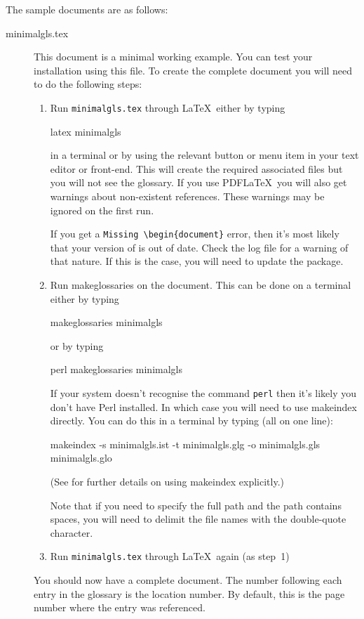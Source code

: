 \documentclass{nlctdoc}
\begin{document}
The sample documents are as follows:
\begin{description}
\item[minimalgls.tex]\label{ex:minimalgls} This document is a
minimal working example. You can test your installation using this
file. To create the complete document you will need to do the
following steps:
  \begin{enumerate}
  \item Run \texttt{minimalgls.tex} through \LaTeX\ either by 
  typing
\begin{prompt}
latex minimalgls
\end{prompt}
  in a terminal or by using the relevant button or menu item in
  your text editor or front-end. This will create the required 
  associated files but you will not see the glossary. If you use 
  PDF\LaTeX\ you will also get warnings about non-existent 
  references. These warnings may be ignored on the first run.

  If you get a \verb"Missing \begin{document}" error, then 
  it's most likely that your version of  is 
  out of date. Check the log file for a warning of that nature. 
  If this is the case, you will need to update the 
  package.

  \item Run \gls{makeglossaries} on the document. This can
  be done on a terminal either by typing
\begin{prompt}
makeglossaries minimalgls
\end{prompt}
  or by typing
\begin{prompt}
perl makeglossaries minimalgls
\end{prompt}
  If your system doesn't recognise the command \texttt{perl} then
  it's likely you don't have Perl installed. In which case you
  will need to use \gls{makeindex} directly. You can do this
  in a terminal by typing (all on one line):
\begin{prompt}
makeindex -s minimalgls.ist -t minimalgls.glg -o minimalgls.gls minimalgls.glo
\end{prompt}
  (See  for further details on using 
   \gls*{makeindex} explicitly.)

  Note that if you need to specify the full path and the path
  contains spaces, you will need to delimit the file names with
  the double-quote character.

  \item Run \texttt{minimalgls.tex} through \LaTeX\ again (as step~1)
  \end{enumerate}
You should now have a complete document. The number following
each entry in the glossary is the location number. By default, this 
is the page number where the entry was referenced.


\end{description}
\end{document}
